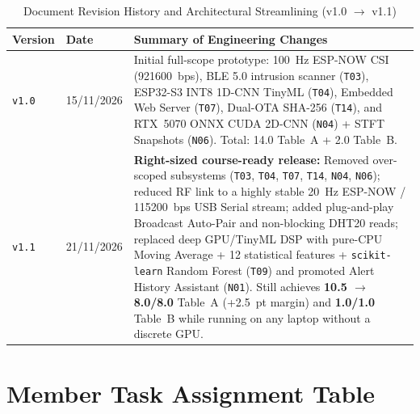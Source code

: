 \documentclass{hcmut-report}
\begin{document}
\begin{table}[H]
\centering
\caption{Document Revision History and Architectural Streamlining (v1.0 $\rightarrow$ v1.1)}
\label{tab:revision_history}
\footnotesize
\begin{tabularx}{\textwidth}{|C{1.4cm}|C{2.3cm}|Y|}
\hline
\textbf{Version} & \textbf{Date} & \textbf{Summary of Engineering Changes} \\
\hline
\texttt{v1.0} & 15/11/2026 & Initial full-scope prototype: 100~Hz ESP-NOW CSI (921600~bps), BLE 5.0 intrusion scanner (\texttt{T03}), ESP32-S3 INT8 1D-CNN TinyML (\texttt{T04}), Embedded Web Server (\texttt{T07}), Dual-OTA SHA-256 (\texttt{T14}), and RTX~5070 ONNX CUDA 2D-CNN (\texttt{N04}) + STFT Snapshots (\texttt{N06}). Total: 14.0 Table~A + 2.0 Table~B. \\
\hline
\texttt{v1.1} & 21/11/2026 & \textbf{Right-sized course-ready release:} Removed over-scoped subsystems (\texttt{T03}, \texttt{T04}, \texttt{T07}, \texttt{T14}, \texttt{N04}, \texttt{N06}); reduced RF link to a highly stable 20~Hz ESP-NOW / 115200~bps USB Serial stream; added plug-and-play Broadcast Auto-Pair and non-blocking DHT20 reads; replaced deep GPU/TinyML DSP with pure-CPU Moving Average + 12 statistical features + \texttt{scikit-learn} Random Forest (\texttt{T09}) and promoted Alert History Assistant (\texttt{N01}). Still achieves \textbf{10.5 $\rightarrow$ 8.0/8.0} Table~A (+2.5~pt margin) and \textbf{1.0/1.0} Table~B while running on any laptop without a discrete GPU. \\
\hline
\end{tabularx}
\end{table}

\section*{Member Task Assignment Table}
\end{document}
